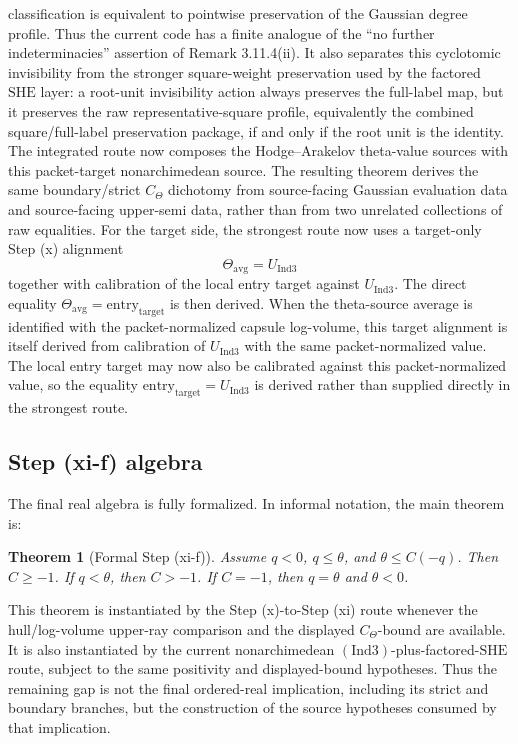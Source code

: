 \documentclass[11pt]{article}
\newcommand{\Ind}{\ensuremath{\mathrm{Ind}}}
\newcommand{\SHE}{\ensuremath{\mathrm{SHE}}}
\theoremstyle{plain}
\newtheorem{theorem}{Theorem}
\theoremstyle{definition}
\theoremstyle{remark}
\begin{document}
classification is equivalent to pointwise preservation of the Gaussian
degree profile.  Thus the current code has a finite analogue of the
``no further indeterminacies'' assertion of Remark 3.11.4(ii).
It also separates this cyclotomic invisibility from the stronger
square-weight preservation used by the factored \(\SHE\) layer: a root-unit
invisibility action always preserves the full-label map, but it preserves the
raw representative-square profile, equivalently the combined
square/full-label preservation package, if and only if the root unit is the
identity.
The integrated route now composes the Hodge--Arakelov theta-value sources with
this packet-target nonarchimedean source.  The resulting theorem derives the
same boundary/strict \(C_\Theta\) dichotomy from source-facing Gaussian
evaluation data and source-facing upper-semi data, rather than from two
unrelated collections of raw equalities.
For the target side, the strongest route now uses a target-only Step (x)
alignment
\[
  \Theta_{\mathrm{avg}}=U_{\Ind3}
\]
together with calibration of the local entry target against \(U_{\Ind3}\).
The direct equality \(\Theta_{\mathrm{avg}}=\mathrm{entry}_{\mathrm{target}}\)
is then derived.
When the theta-source average is identified with the packet-normalized capsule
log-volume, this target alignment is itself derived from calibration of
\(U_{\Ind3}\) with the same packet-normalized value.
The local entry target may now also be calibrated against this packet-normalized
value, so the equality
\(\mathrm{entry}_{\mathrm{target}}=U_{\Ind3}\) is derived rather than supplied
directly in the strongest route.

\subsection{Step (xi-f) algebra}

The final real algebra is fully formalized.  In informal notation, the main
theorem is:

\begin{theorem}[Formal Step (xi-f)]
Assume \(q<0\), \(q\le\theta\), and \(\theta\le C(-q)\).  Then \(C\ge -1\).
If \(q<\theta\), then \(C>-1\).  If \(C=-1\), then \(q=\theta\) and
\(\theta<0\).
\end{theorem}

This theorem is instantiated by the Step (x)-to-Step (xi) route whenever the
hull/log-volume upper-ray comparison and the displayed \(C_\Theta\)-bound are
available.
It is also instantiated by the current nonarchimedean
\((\Ind3)\)-plus-factored-\SHE{} route, subject to the same positivity and
displayed-bound hypotheses.  Thus the remaining gap is not the final
ordered-real implication, including its strict and boundary branches, but the
construction of the source hypotheses consumed by that implication.
\end{document}
